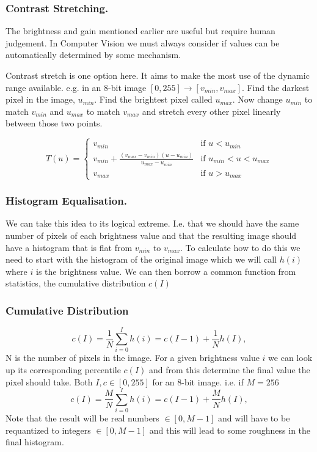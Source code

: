 \begin{frame}\frametitle{Contrast Stretching.}

The brightness and gain mentioned earlier are useful but require human judgement. In Computer Vision we must always consider if values can be automatically determined by some mechanism.

Contrast stretch is one option here. It aims to make the most use of the dynamic range available. e.g. in an 8-bit image $[0,255] \rightarrow{[v_{min},v_{max}]}$. Find the darkest pixel in the image, $u_{min}$. Find the brightest pixel called $u_{max}$.  Now change $u_{min}$ to match $v_{min}$ and $u_{max}$ to match $v_{max}$ and stretch every other pixel linearly between those two points.


\begin{equation}
    T(u) = 
            \begin{cases}
            v_{min} & \text{if } u<u_{min}\\
            v_{min}+\frac{(v_{max} - v_{min})(u-u_{min})}{u_{max}-u_{min}} & \text{if } u_{min}<u<u_{max}\\
            v_{max} & \text{if } u>u_{max}
            \end{cases}
\end{equation}
\end{frame}

\begin{frame}\frametitle{Histogram Equalisation.}
We can take this idea to its logical extreme. I.e. that we should have the same number of pixels of each brightness value and that the resulting image should have a histogram that is flat from $v_{min}$ to $v_{max}$.
To calculate how to do this we need to start with the histogram of the original image which we will call $h(i)$ where $i$ is the brightness value.
We can then borrow a common function from statistics, the cumulative distribution $c(I)$
\end{frame}
\begin{frame}\frametitle{Cumulative Distribution}
\begin{equation}
    c(I) = \frac{1}{N}\sum_{i=0}^I h(i) = c(I-1)+\frac{1}{N}h(I),
\end{equation}
N is the number of pixels in the image. For a given brightness value $i$ we can look up its corresponding percentile $c(I)$ and from this determine the final value the pixel should take. Both $I,c \in [0, 255]$ for an 8-bit image. i.e. if $M=256$
\begin{equation}
    c(I) = \frac{M}{N}\sum_{i=0}^I h(i) = c(I-1)+\frac{M}{N}h(I),
\end{equation}
Note that the result will be real numbers $\in [0,M-1]$ and will have to be requantized to integers $\in [0,M-1]$ and this will lead to some roughness in the final histogram.
\end{frame}



